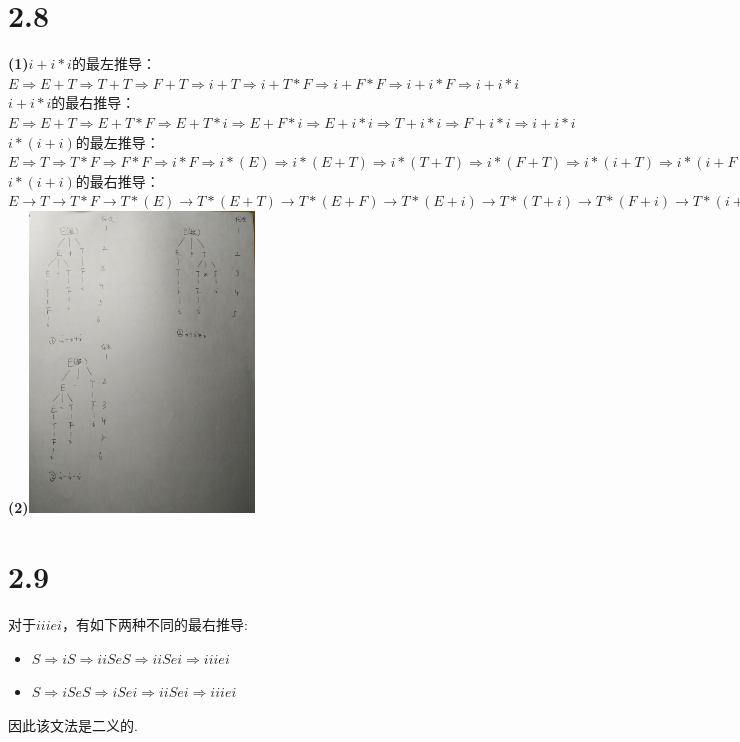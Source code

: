 \documentclass{article}
\begin{document}
\section*{2.8}
\noindent 
\textbf{(1)}$i+i*i$的最左推导：$E\Rightarrow E+T\Rightarrow T+T\Rightarrow F+T\Rightarrow i+T\Rightarrow i+T*F\Rightarrow i+F*F\Rightarrow i+i*F\Rightarrow i+i*i$\\
$i+i*i$的最右推导：$E\Rightarrow E+T\Rightarrow E+T*F\Rightarrow E+T*i\Rightarrow E+F*i\Rightarrow E+i*i\Rightarrow T+i*i\Rightarrow F+i*i\Rightarrow i+i*i$\\
$i*(i+i)$的最左推导：$E\Rightarrow T \Rightarrow T*F\Rightarrow F*F\Rightarrow i*F\Rightarrow i*(E)\Rightarrow i*(E+T)\Rightarrow i*(T+T)\Rightarrow i*(F+T)\Rightarrow i*(i+T)\Rightarrow i*(i+F)\Rightarrow i*(i+i)$\\
$i*(i+i)$的最右推导：$E\rightarrow T\rightarrow T*F\rightarrow T*(E)\rightarrow T*(E+T)\rightarrow T*(E+F)\rightarrow T*(E+i)\rightarrow T*(T+i)\rightarrow T*(F+i)\rightarrow T*(i+i)\rightarrow F*(i+i)\rightarrow i*(i+i)$\\
\textbf{(2)}\includegraphics[height=8cm,angle=270]{1_1.jpg}
\section*{2.9}
\noindent 
对于$iiiei$，有如下两种不同的最右推导:
\begin{itemize}
    \item [-] $S\Rightarrow iS\Rightarrow iiSeS\Rightarrow iiSei\Rightarrow iiiei$
    \item [-] $S\Rightarrow iSeS\Rightarrow iSei\Rightarrow iiSei\Rightarrow iiiei$
\end{itemize}
因此该文法是二义的.
\end{document}
